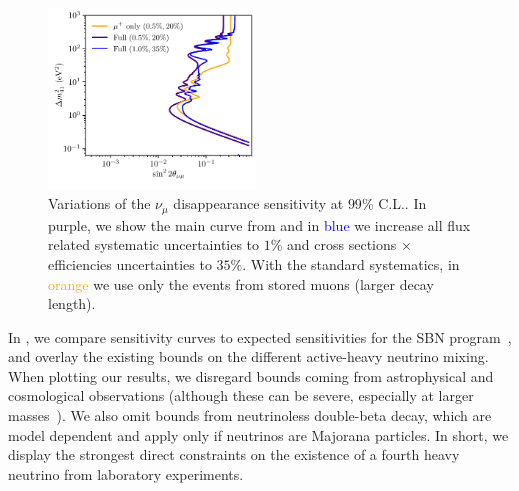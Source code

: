 \begin{figure}[t]
\centering
\includegraphics[width=0.49\textwidth]{figs/Comparison_dis.pdf}
\caption[Variations of the $\nu_\mu$ disappearance sensitivity.]{Variations of the $\nu_\mu$ disappearance sensitivity at $99\%$ C.L.. In \textcolor{darkindigo}{purple}, we show the main curve from  and in \textcolor{blue}{blue} we increase all flux related systematic uncertainties to $1\%$ and cross sections $\times$ efficiencies uncertainties to $35\%$. With the standard systematics, in \textcolor{orange}{orange} we use only the events from stored muons (larger decay length).\label{fig:3+1sens_v2}}
\end{figure}
%
In , we compare \nus sensitivity curves to expected sensitivities for the SBN program~\cite{Cianci2017}, and overlay the existing bounds on the different active-heavy neutrino mixing. When plotting our results, we disregard bounds coming from astrophysical and cosmological observations (although these can be severe, especially at larger masses~\cite{Abazajian:2017tcc,Bridle:2016isd}). We also omit bounds from neutrinoless double-beta decay, which are model dependent and apply only if neutrinos are Majorana particles. In short, we display the strongest direct constraints on the existence of a fourth heavy neutrino from laboratory experiments. 

